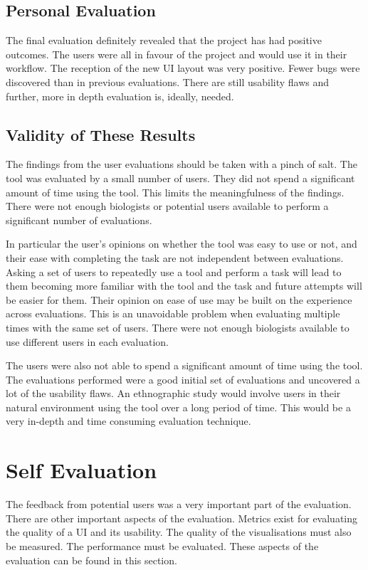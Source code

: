 \subsection{Personal Evaluation}

The final evaluation definitely revealed that the project has had positive outcomes.  The users were all in favour of the project and would use it in their workflow.  The reception of the new \ac{UI} layout was very positive.  Fewer bugs were discovered than in previous evaluations. There are still usability flaws and further, more in depth evaluation is, ideally, needed.

\subsection{Validity of These Results}
The findings from the user evaluations should be taken with a pinch of salt.  The tool was evaluated by a small number of users.  They did not spend a significant amount of time using the tool.  This limits the meaningfulness of the findings.  There were not enough biologists or potential users available to perform a significant number of evaluations.

In particular the user's opinions on whether the tool was easy to use or not, and their ease with completing the task are not independent between evaluations.  Asking a set of users to repeatedly use a tool and perform a task will lead to them becoming more familiar with the tool and the task and future attempts will be easier for them.  Their opinion on ease of use may be built on the experience across evaluations.  This is an unavoidable problem when evaluating multiple times with the same set of users.  There were not enough biologists available to use different users in each evaluation.

The users were also not able to spend a significant amount of time using the tool.  The evaluations performed were a good initial set of evaluations and uncovered a lot of the usability flaws.  An ethnographic study would involve users in their natural environment using the tool over a long period of time.  This would be a very in-depth and time consuming evaluation technique.

\section{Self Evaluation}
The feedback from potential users was a very important part of the evaluation.  There are other important aspects of the evaluation.  Metrics exist for evaluating the quality of a \ac{UI} and its usability.  The quality of the visualisations must also be measured.  The performance must be evaluated.  These aspects of the evaluation can be found in this section.

